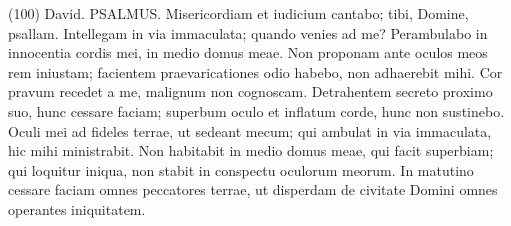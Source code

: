 \begin{biblechapter}  (100) 
\verse  David. PSALMUS. Misericordiam et iudicium cantabo; tibi, Domine, psallam. 
\verse Intellegam in via immaculata; quando venies ad me? Perambulabo in innocentia cordis mei, in medio domus meae. 
\verse Non proponam ante oculos meos rem iniustam; facientem praevaricationes odio habebo, non adhaerebit mihi. 
\verse Cor pravum recedet a me, malignum non cognoscam. 
\verse Detrahentem secreto proximo suo, hunc cessare faciam; superbum oculo et inflatum corde, hunc non sustinebo. 
\verse Oculi mei ad fideles terrae, ut sedeant mecum; qui ambulat in via immaculata, hic mihi ministrabit. 
\verse Non habitabit in medio domus meae, qui facit superbiam; qui loquitur iniqua, non stabit in conspectu oculorum meorum. 
\verse In matutino cessare faciam omnes peccatores terrae, ut disperdam de civitate Domini omnes operantes iniquitatem. 
\end{biblechapter}

